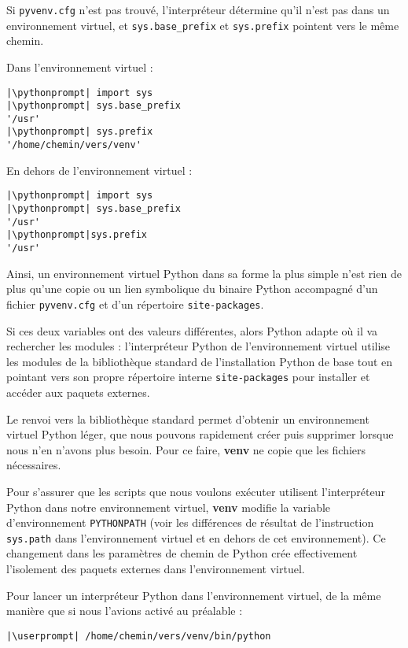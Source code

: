 Si \texttt{pyvenv.cfg} n'est pas trouvé, l'interpréteur détermine qu'il n'est pas dans un environnement virtuel, et \texttt{sys.base\_prefix} et \texttt{sys.prefix} pointent vers le même chemin.

Dans l'environnement virtuel :
\begin{lstlisting}[style=repl]
|\pythonprompt| import sys
|\pythonprompt| sys.base_prefix
'/usr'
|\pythonprompt| sys.prefix
'/home/chemin/vers/venv'
\end{lstlisting}

En dehors de l'environnement virtuel :
\begin{lstlisting}[style=repl]
|\pythonprompt| import sys
|\pythonprompt| sys.base_prefix
'/usr'
|\pythonprompt|sys.prefix
'/usr'
\end{lstlisting}

Ainsi, un environnement virtuel Python dans sa forme la plus simple n'est rien de plus qu’une copie ou un lien symbolique du binaire Python accompagné d’un fichier \texttt{pyvenv.cfg} et d’un répertoire \texttt{site-packages}. 

Si ces deux variables ont des valeurs différentes, alors Python adapte où il va rechercher les modules : l’interpréteur Python de l'environnement virtuel utilise les modules de la bibliothèque standard de l'installation Python de base tout en pointant vers son propre répertoire interne \texttt{site-packages} pour installer et accéder aux paquets externes.

Le renvoi vers la bibliothèque standard permet d'obtenir un environnement virtuel Python léger, que nous pouvons rapidement créer puis supprimer lorsque nous n’en n'avons plus besoin. Pour ce faire, \textbf{venv} ne copie que les fichiers nécessaires.

Pour s’assurer que les scripts que nous voulons exécuter utilisent l’interpréteur Python dans notre environnement virtuel, \textbf{venv} modifie la variable d’environnement \texttt{PYTHONPATH} (voir les différences de résultat de l'instruction \texttt{sys.path} dans l'environnement virtuel et en dehors de cet environnement). Ce changement dans les paramètres de chemin de Python crée effectivement l’isolement des paquets externes dans l'environnement virtuel.

Pour lancer un interpréteur Python dans l'environnement virtuel, de la même manière que si nous l'avions activé au préalable :
\begin{lstlisting}[style=bash]
|\userprompt| /home/chemin/vers/venv/bin/python
\end{lstlisting}

